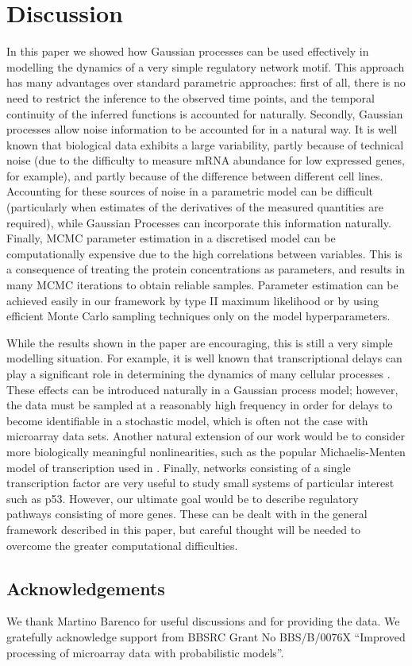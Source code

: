 \documentclass[english]{article}
\begin{document}
\section{Discussion}
In this paper we showed how Gaussian processes can be used effectively
in modelling the dynamics of a very simple regulatory network motif.
This approach has many advantages over standard parametric approaches:
first of all, there is no need to restrict the inference to the
observed time points, and the temporal continuity of the inferred
functions is accounted for naturally. Secondly, Gaussian processes
allow noise information to be accounted for in a natural way. It is
well known that biological data exhibits a large variability, partly
because of technical noise (due to the difficulty to measure mRNA
abundance for low expressed genes, for example), and partly because of
the difference between different cell lines. Accounting for these
sources of noise in a parametric model can be difficult (particularly
when estimates of the derivatives of the measured quantities are
required), while Gaussian Processes can incorporate this information
naturally. Finally, MCMC parameter estimation in a discretised model
can be computationally expensive due to the high correlations between
variables. This is a consequence of treating the protein
concentrations as parameters, and results in many MCMC iterations to
obtain reliable samples.  Parameter estimation can be achieved easily
in our framework by type II maximum likelihood or by using efficient
Monte Carlo sampling techniques only on the model hyperparameters.

While the results shown in the paper are encouraging, this is still a very 
simple modelling situation. For example, it is well known that transcriptional 
delays can play a significant role in determining the dynamics of many
cellular processes \cite{Monk03}. These effects can be introduced naturally
in a Gaussian process model; however, the data must be sampled at a reasonably
high frequency in order for delays to become identifiable in a stochastic 
model, which is often not the case with microarray data sets. Another natural
extension of our work would be to consider more biologically meaningful
nonlinearities, such as the popular Michaelis-Menten model of transcription 
used in \cite{Rogers:model06b}. Finally, networks consisting of a single
transcription factor are very useful
to study small systems of particular interest such as p53. However, our 
ultimate goal would be to describe regulatory pathways consisting of
more genes. These can be
dealt with in the general framework described in this paper, but 
careful thought
will be needed to overcome the greater computational difficulties.

\subsection*{Acknowledgements}

We thank Martino Barenco for useful discussions and for
providing the data. We gratefully acknowledge support from BBSRC Grant No BBS/B/0076X ``Improved processing of microarray data with probabilistic models''.
%
\small


\end{document}
